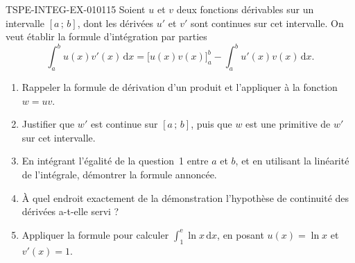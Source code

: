 \begin{exercice}{TSPE-INTEG-EX-010}{1}{15}
Soient $u$ et $v$ deux fonctions dérivables sur un intervalle $[a\,;\,b]$, dont
les dérivées $u'$ et $v'$ sont continues sur cet intervalle. On veut établir la
formule d'intégration par parties
\[
  \int_a^b u(x)v'(x)\,\mathrm{d}x
  =\Big[u(x)v(x)\Big]_a^b-\int_a^b u'(x)v(x)\,\mathrm{d}x.
\]
\begin{enumerate}
  \item Rappeler la formule de dérivation d'un produit et l'appliquer à la
    fonction $w=uv$.
  \item Justifier que $w'$ est continue sur $[a\,;\,b]$, puis que $w$ est une
    primitive de $w'$ sur cet intervalle.
  \item En intégrant l'égalité de la question~1 entre $a$ et $b$, et en utilisant
    la linéarité de l'intégrale, démontrer la formule annoncée.
  \item À quel endroit exactement de la démonstration l'hypothèse de continuité
    des dérivées a-t-elle servi ?
  \item Appliquer la formule pour calculer
    $\displaystyle\int_1^{\mathrm{e}}\ln x\,\mathrm{d}x$, en posant
    $u(x)=\ln x$ et $v'(x)=1$.
\end{enumerate}
\end{exercice}
